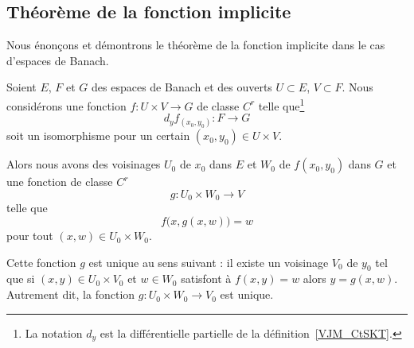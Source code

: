 \subsection{Théorème de la fonction implicite}

Nous énonçons et démontrons le théorème de la fonction implicite dans le cas d'espaces de Banach.
\begin{theorem} \label{ThoAcaWho}
    Soient \( E\), \( F\) et \( G\) des espaces de Banach et des ouverts \( U\subset E\), \( V\subset F\). Nous considérons une fonction \( f\colon U\times V\to G\) de classe \( C^r\) telle que\footnote{La notation \( d_y\) est la différentielle partielle de la définition~\ref{VJM_CtSKT}.}
    \begin{equation}
        d_yf_{(x_0,y_0)}\colon F\to G
    \end{equation}
    soit un isomorphisme pour un certain \( (x_0,y_0)\in U\times V\).

    Alors nous avons des voisinages \( U_0\) de \( x_0\) dans \( E\) et \( W_0\) de \( f(x_0,y_0)\) dans \( G\) et une fonction de classe \( C^r\)
    \begin{equation}
        g\colon U_0\times W_0\to V
    \end{equation}
    telle que
    \begin{equation}
        f\big( x,g(x,w) \big)=w
    \end{equation}
    pour tout \( (x,w)\in U_0\times W_0\).

    Cette fonction \( g\) est unique au sens suivant : il existe un voisinage \( V_0 \) de \( y_0\) tel que si \( (x,y)\in U_0\times V_0\) et \( w\in W_0\) satisfont à \( f(x,y)=w\) alors \( y=g(x,w)\). Autrement dit, la fonction \( g\colon U_0\times W_0\to V_0\) est unique.
\end{theorem}

